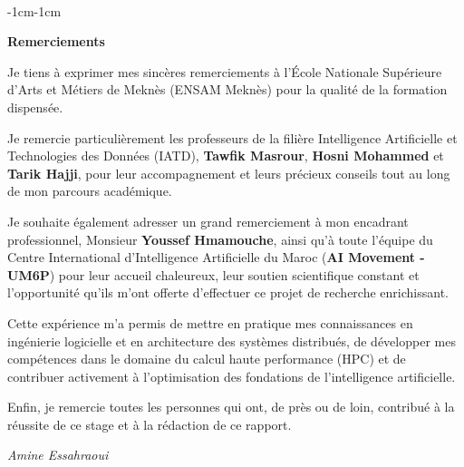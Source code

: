 \documentclass[12pt,a4paper]{report}
\begin{document}
\newpage
\thispagestyle{empty}
~
\newpage

\begin{adjustwidth}{-1cm}{-1cm}

\begin{center}
    {\LARGE \textbf{Remerciements}}
\end{center}

\vspace{1.5cm}

\begin{center}
\begin{minipage}{0.9\textwidth}
\large

Je tiens à exprimer mes sincères remerciements à l'École Nationale Supérieure d'Arts et Métiers de Meknès (ENSAM Meknès) pour la qualité de la formation dispensée.

\vspace{0.7cm}

Je remercie particulièrement les professeurs de la filière Intelligence Artificielle et Technologies des Données (IATD), \textbf{Tawfik Masrour}, \textbf{Hosni Mohammed} et \textbf{Tarik Hajji}, pour leur accompagnement et leurs précieux conseils tout au long de mon parcours académique.

\vspace{0.7cm}

Je souhaite également adresser un grand remerciement à mon encadrant professionnel, Monsieur \textbf{Youssef Hmamouche}, ainsi qu'à toute l'équipe du Centre International d'Intelligence Artificielle du Maroc (\textbf{AI Movement - UM6P}) pour leur accueil chaleureux, leur soutien scientifique constant et l'opportunité qu'ils m'ont offerte d'effectuer ce projet de recherche enrichissant.

\vspace{0.7cm}

Cette expérience m'a permis de mettre en pratique mes connaissances en ingénierie logicielle et en architecture des systèmes distribués, de développer mes compétences dans le domaine du calcul haute performance (HPC) et de contribuer activement à l'optimisation des fondations de l'intelligence artificielle.

\vspace{0.7cm}

Enfin, je remercie toutes les personnes qui ont, de près ou de loin, contribué à la réussite de ce stage et à la rédaction de ce rapport.

\end{minipage}
\end{center}

\vspace{1.5cm}

\begin{flushright}
\textit{Amine Essahraoui}
\end{flushright}

\end{adjustwidth}
\newpage
\thispagestyle{empty}
\end{document}
